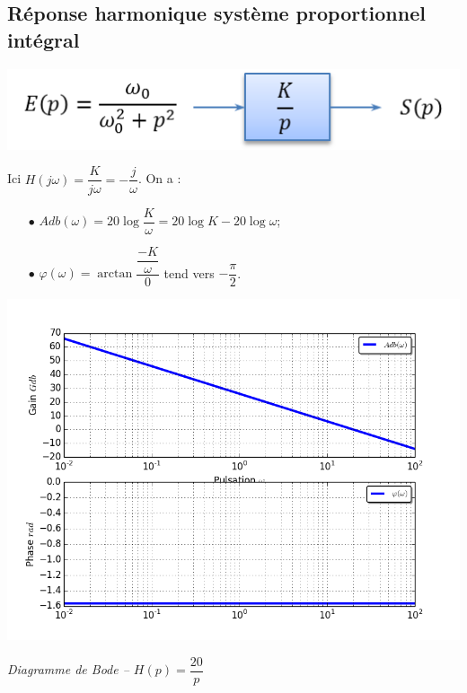 \documentclass[10pt,oneside]{article}
\begin{document}
\subsection{Réponse harmonique système proportionnel intégral}
\begin{minipage}[c]{.48\linewidth}
\begin{center}
\includegraphics[width=.9\textwidth]{png/proportionnel_integral_bloc}
\end{center}
Ici $H(j\omega)=\dfrac{K}{j\omega}=-\dfrac{j}{\omega}$. On a :
\begin{itemize}
\item [$\bullet$] $Adb(\omega)=20 \log \dfrac{K}{\omega}=20\log K -20\log \omega$;
\item [$\bullet$] $\varphi(\omega)= \arctan \dfrac{\dfrac{-K}{\omega}}{0}$ tend vers $-\dfrac{\pi}{2}$.
\end{itemize}
\end{minipage}\hfill
\begin{minipage}[c]{.48\linewidth}
\begin{center}
\includegraphics[width=.9\textwidth]{png/proportionnel_integral_bode}

\textit{Diagramme de Bode -- $H(p)= \dfrac{20}{p}$}
\end{center}
\end{minipage}
\end{document}
